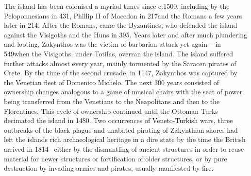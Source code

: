 The island has been colonised a myriad times since c.1500\BC, including by the Peloponnesians in 431\BC, Phillip II of Macedon in 217\BC and the Romans a few years later in 214\BC. After the Romans, came the Byzantines, who defended the island against the Visigoths and the Huns in 395\AD. Years later and after much plundering and looting, Zakynthos was the victim of barbarian attack yet again -- in 549\AD when the Visigoths, under Totilas, overran the island. The island suffered further attacks almost every year, mainly tormented by the Saracen pirates of Crete. By the time of the second crusade, in 1147\AD, Zakynthos was captured by the Venetian fleet of Domenico Michelo. The next 300 years consisted of ownership changes analogous to a game of musical chairs with the seat of power being transferred from the Venetians to the Neapolitans and then to the Florentines. This cycle of ownership continued until the Ottoman Turks decimated the island in 1480\AD. Two occurrences of Veneto-Turkish wars, three outbreaks of the black plague and unabated pirating of Zakynthian shores had left the islands rich archaeological heritage in a dire state by the time the British arrived in 1814\AD -- either by the dismantling of ancient structures in order to reuse material for newer structures or fortification of older structures, or by pure destruction by invading armies and pirates, usually manifested by fire.
	
